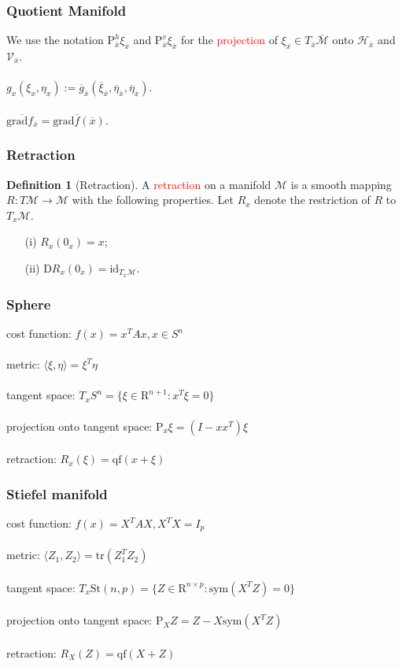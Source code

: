 \documentclass[notheorems,envcountsect,pdfpagemode=FullScreen,12pt]{beamer}
\theoremstyle{plain}
\theoremstyle{definition}
\newtheorem{defin}{Definition}
\theoremstyle{example}
\begin{document}
\begin{frame}
\frametitle{Quotient Manifold}
\quad We use the notation $\mathrm{P}^h_{\overline{x}}\xi_{\overline{x}}$ and $\mathrm{P}^v_{\overline{x}}\xi_{\overline{x}}$ for the \textcolor{red}{projection} of $\xi_{\overline{x}}\in T_{\overline{x}}\overline{\mathcal{M}}$ onto $\mathcal{H}_{\overline{x}}$ and $\mathcal{V}_{\overline{x}}$.
\\~\\
\quad $g_x(\xi_x,\eta_x):=\overline{g}_{\overline{x}}(\overline{\xi}_{\overline{x}},\overline{\eta}_{\overline{x}},\overline{\eta}_{\overline{x}})$.
\\~\\
\quad $\overline{\mathrm{grad}f_{\overline{x}}}=\mathrm{grad}\overline{f}(\overline{x})$.
\end{frame}

\begin{frame}
\frametitle{Retraction}
\begin{defin}[Retraction]
A \textcolor{red}{retraction} on a manifold $\mathcal{M}$ is a smooth mapping $R:T\mathcal{M}\to\mathcal{M}$ with the following properties. Let $R_x$ denote the restriction of $R$ to $T_x\mathcal{M}$.
\begin{itemize}
\item[(i)] $R_x(0_x)=x$;
\item[(ii)] $\mathrm{D}R_x(0_x)=\mathrm{id}_{T_x\mathcal{M}}$.
\end{itemize}
\end{defin}
\end{frame}

\begin{frame}
\frametitle{Sphere}
cost function: $f(x)=x^TAx, x\in S^n$
\\~\\
metric: $\langle\xi,\eta\rangle=\xi^T\eta$
\\~\\
tangent space: $T_xS^n=\{\xi\in\mathrm{R}^{n+1}:x^T\xi=0\}$
\\~\\
projection onto tangent space: $\mathrm{P}_x\xi=(I-xx^T)\xi$
\\~\\
retraction: $R_x(\xi)=\mathrm{qf}(x+\xi)$
\end{frame}

\begin{frame}
\frametitle{Stiefel manifold}
cost function: $f(x)=X^TAX, X^TX=I_p$
\\~\\
metric: $\langle Z_1,Z_2\rangle=\mathrm{tr}(Z_1^T Z_2)$
\\~\\
tangent space: $T_x\mathrm{St}(n,p)=\{Z\in\mathrm{R}^{n\times p}:\mathrm{sym}(X^T Z)=0\}$
\\~\\
projection onto tangent space: $\mathrm{P}_X Z=Z-X\mathrm{sym}(X^TZ)$
\\~\\
retraction: $R_X(Z)=\mathrm{qf}(X+Z)$
\end{frame}
\end{document}
